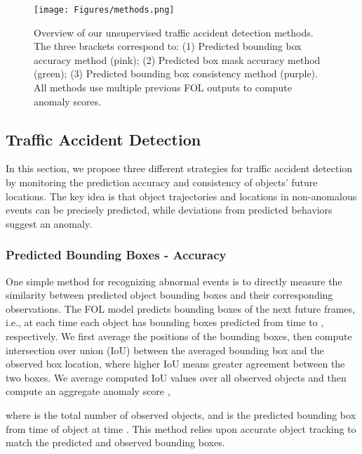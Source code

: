 \documentclass[letterpaper, 10 pt, conference]{ieeeconf}
\theoremstyle{definition}
\theoremstyle{remark}
\begin{document}
\begin{figure*}
    \vspace{5pt}
    \centering
    \texttt{[image: Figures/methods.png]}
    \caption{
        Overview of our unsupervised traffic accident detection methods. The three brackets correspond to: (1) Predicted bounding box accuracy method (pink); (2) Predicted box mask accuracy method (green); (3) Predicted bounding box consistency method (purple). All methods use multiple previous FOL outputs to compute anomaly scores.
    }
    \label{fig:metrics}
    \vspace{-12pt}
\end{figure*}

\subsection{Traffic Accident Detection}
\label{sec:metrics}
In this section, we propose three different strategies for traffic
accident detection by monitoring the prediction accuracy and consistency
of objects' future locations. The key idea is that object trajectories
and locations in non-anomalous events can be precisely predicted,
while deviations from predicted behaviors suggest an anomaly.

\subsubsection{Predicted Bounding Boxes - Accuracy}
\label{sec:metrics_one}
One simple method for recognizing abnormal
events is to directly measure the similarity between predicted
object bounding boxes and their corresponding observations.
The FOL model predicts bounding boxes
of the next  future frames, i.e., at each time  each object has  bounding boxes
predicted from time  to , respectively.
We first average the positions of the  bounding boxes,
then compute intersection over union (IoU) between the averaged bounding box and the observed box location,
where higher IoU means greater agreement between the two boxes.
We average computed IoU values over all observed
objects and then compute an aggregate anomaly score ,

where  is the total number of observed objects, and 
is the predicted bounding box from time  of object  at time .
This method relies upon accurate object tracking to match the predicted
and observed bounding boxes.
\end{document}
